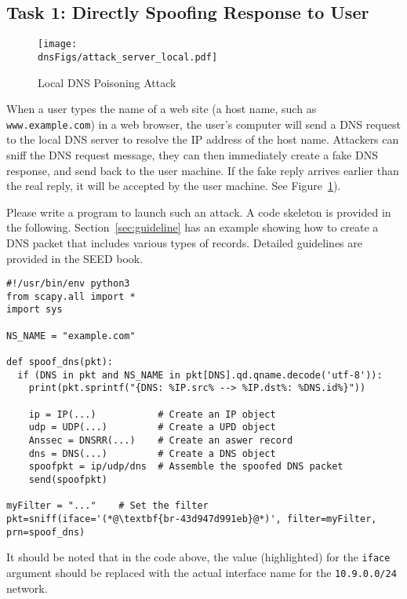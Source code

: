 \subsection{Task 1: Directly Spoofing Response to User}



\begin{figure}[htb]
\centering
\texttt{[image: \\dnsFigs/attack\_server\_local.pdf]}
\caption{Local DNS Poisoning Attack}
\label{dns:fig:local_attack}
\end{figure}


When a user types the name of a web site (a host name, such as {\tt
www.example.com}) in a web browser, the user's computer will send a DNS 
request to the local DNS server to resolve the IP address of the host name.  
Attackers can sniff the DNS request message,
they can then immediately create a fake DNS response, 
and send back to the user machine. If the fake reply arrives
earlier than the real reply, it will be accepted by the user machine.
See Figure~\ref{dns:fig:local_attack}). 

Please write a program to launch such an attack. A code 
skeleton is provided in the following. Section~\ref{sec:guideline}
has an example showing how to create a DNS packet that includes 
various types of records. Detailed guidelines are 
provided in the SEED book. 


\begin{lstlisting}
#!/usr/bin/env python3
from scapy.all import *
import sys

NS_NAME = "example.com"

def spoof_dns(pkt):
  if (DNS in pkt and NS_NAME in pkt[DNS].qd.qname.decode('utf-8')):
    print(pkt.sprintf("{DNS: %IP.src% --> %IP.dst%: %DNS.id%}"))

    ip = IP(...)           # Create an IP object
    udp = UDP(...)         # Create a UPD object
    Anssec = DNSRR(...)    # Create an aswer record
    dns = DNS(...)         # Create a DNS object
    spoofpkt = ip/udp/dns  # Assemble the spoofed DNS packet
    send(spoofpkt)

myFilter = "..."    # Set the filter
pkt=sniff(iface='(*@\textbf{br-43d947d991eb}@*)', filter=myFilter, prn=spoof_dns)
\end{lstlisting}

It should be noted that in the code above, the value (highlighted) for the 
\texttt{iface} argument should be replaced with the actual interface 
name for the \texttt{10.9.0.0/24} network.  
 

